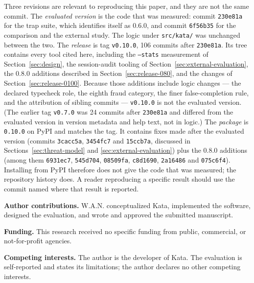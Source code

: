 \documentclass{sbc2019}%
\newif\ifanon
\begin{document}
Three revisions are relevant to reproducing this paper, and they are not the
same commit. The \emph{evaluated version} is the code that was measured:
commit \texttt{230e81a} for the trap suite, which identifies itself as 0.6.0,
and commit \texttt{6f56b35} for the comparison and the external study. The
logic under \texttt{src/kata/} was unchanged between the two. The
\emph{release} is tag \texttt{v0.10.0}, 106 commits after \texttt{230e81a}. Its
tree contains every tool cited here, including the \texttt{--stats}
measurement of Section~\ref{sec:design}, the session-audit tooling of
Section~\ref{sec:external-evaluation}, the 0.8.0 additions described in
Section~\ref{sec:release-080}, and the changes of
Section~\ref{sec:release-0100}. Because those additions include logic changes
--- the declared typecheck role, the eighth fraud category, the finer
false-completion rule, and the attribution of sibling commits ---
\texttt{v0.10.0} is not the evaluated version. (The earlier tag
\texttt{v0.7.0} was 24 commits after \texttt{230e81a} and differed from the
evaluated version in version metadata and help text, not in logic.) The
\emph{package} is \texttt{0.10.0} on PyPI and matches the tag. It contains
fixes made after the evaluated version (commits \texttt{3cacc5a},
\texttt{3454fc7} and \texttt{15ccb7a}, discussed in
Sections~\ref{sec:threat-model} and \ref{sec:external-evaluation}) plus the
0.8.0 additions (among them \texttt{6931ec7}, \texttt{545d704},
\texttt{08509fa}, \texttt{c8d1690}, \texttt{2a16486} and
\texttt{075c6f4}). Installing from PyPI therefore does not give the
code that was measured; the repository history does. A reader reproducing a
specific result should use the commit named where that result is reported.

\noindent\textbf{Author contributions.}
\ifanon Omitted for review.\else W.A.N. conceptualized Kata, implemented the software, designed the
evaluation, and wrote and approved the submitted manuscript.\fi

\noindent\textbf{Funding.}
This research received no specific funding from public, commercial, or
not-for-profit agencies.

\noindent\textbf{Competing interests.}
The author is the developer of Kata. The evaluation is self-reported
and states its limitations; the author declares no other competing interests.
\end{document}
